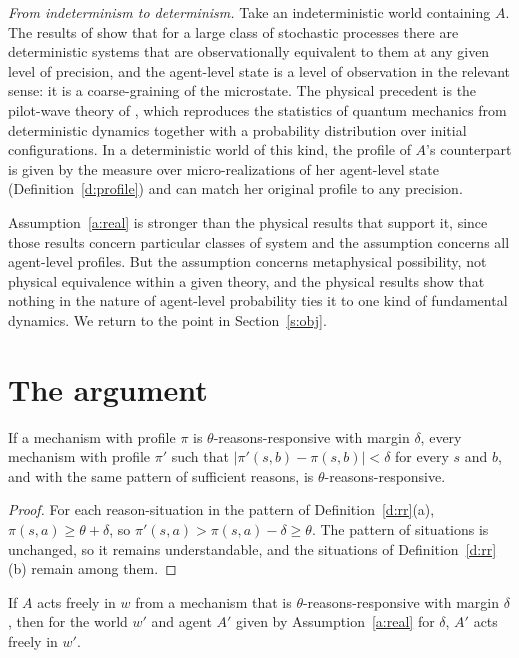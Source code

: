 \documentclass{situationist-preprint}
\begin{document}
\emph{From indeterminism to determinism.} Take an indeterministic world containing $A$. The results of \citet{Werndl2009} show that for a large class of stochastic processes there are deterministic systems that are observationally equivalent to them at any given level of precision, and the agent-level state is a level of observation in the relevant sense: it is a coarse-graining of the microstate. The physical precedent is the pilot-wave theory of \citet{Bohm1952}, which reproduces the statistics of quantum mechanics from deterministic dynamics together with a probability distribution over initial configurations. In a deterministic world of this kind, the profile of $A$'s counterpart is given by the measure over micro-realizations of her agent-level state (Definition~\ref{d:profile}) and can match her original profile to any precision.

Assumption~\ref{a:real} is stronger than the physical results that support it, since those results concern particular classes of system and the assumption concerns all agent-level profiles. But the assumption concerns metaphysical possibility, not physical equivalence within a given theory, and the physical results show that nothing in the nature of agent-level probability ties it to one kind of fundamental dynamics. We return to the point in Section~\ref{s:obj}.

\section{The argument}\label{s:arg}

\begin{lemma}[Margin]\label{l:margin}
If a mechanism with profile $\pi$ is $\theta$-reasons-responsive with margin $\delta$, every mechanism with profile $\pi'$ such that $|\pi'(s,b) - \pi(s,b)| < \delta$ for every $s$ and $b$, and with the same pattern of sufficient reasons, is $\theta$-reasons-responsive.
\end{lemma}

\begin{proof}
For each reason-situation in the pattern of Definition~\ref{d:rr}(a), $\pi(s,a) \geq \theta + \delta$, so $\pi'(s,a) > \pi(s,a) - \delta \geq \theta$. The pattern of situations is unchanged, so it remains understandable, and the situations of Definition~\ref{d:rr}(b) remain among them.
\end{proof}

\begin{lemma}[Counterpart]\label{l:counter}
If $A$ acts freely in $w$ from a mechanism that is $\theta$-reasons-responsive with margin $\delta$, then for the world $w'$ and agent $A'$ given by Assumption~\ref{a:real} for $\delta$, $A'$ acts freely in $w'$.
\end{lemma}
\end{document}
